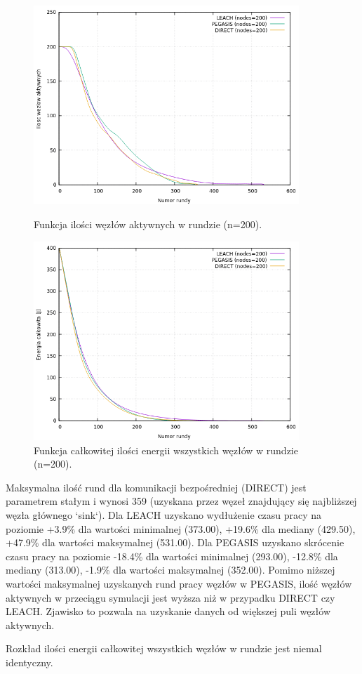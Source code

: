\documentclass[a4paper,12pt,twoside,openany]{report}
\begin{document}
\begin{figure}[H]
 \centering
 \includegraphics[width=10cm]{images/gnuplot/test_2/nodes_in_round_200.png}
 \caption{Funkcja ilości węzłów aktywnych w rundzie (n=200).}
 \includegraphics[width=10cm]{images/gnuplot/test_2/energy_in_round_200.png}
 \caption{Funkcja całkowitej ilości energii wszystkich węzłów w rundzie (n=200).}
\end{figure}

\par
Maksymalna ilość rund dla komunikacji bezpośredniej (DIRECT) jest parametrem stałym i wynosi 359 (uzyskana przez węzeł znajdujący się najbliższej węzła głównego `sink`).
Dla LEACH uzyskano wydłużenie czasu pracy na poziomie +3.9\% dla wartości minimalnej (373.00), +19.6\% dla mediany (429.50), +47.9\% dla wartości maksymalnej (531.00).
Dla PEGASIS uzyskano skrócenie czasu pracy na poziomie -18.4\% dla wartości minimalnej (293.00), -12.8\% dla mediany (313.00), -1.9\% dla wartości maksymalnej (352.00).
Pomimo niższej wartości maksymalnej uzyskanych rund pracy węzłów w PEGASIS, ilość węzłów aktywnych w przeciągu symulacji jest wyższa niż w przypadku DIRECT czy LEACH.
Zjawisko to pozwala na uzyskanie danych od większej puli węzłów aktywnych.
\par
Rozkład ilości energii całkowitej wszystkich węzłów w rundzie jest niemal identyczny.
\end{document}
